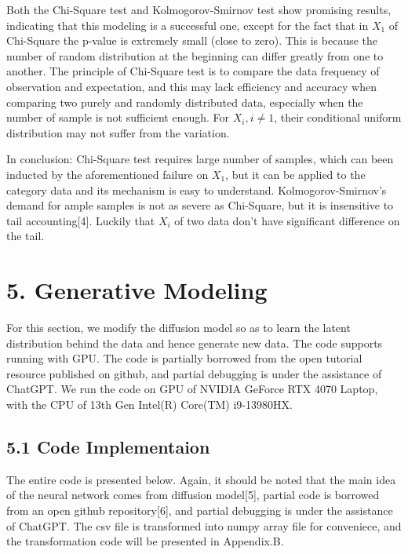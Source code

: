 \documentclass[11pt]{article}
\begin{document}
    Both the Chi-Square test and Kolmogorov-Smirnov test show promising
results, indicating that this modeling is a successful one, except for
the fact that in \(X_1\) of Chi-Square the p-value is extremely small
(close to zero). This is because the number of random distribution at
the beginning can differ greatly from one to another. The principle of
Chi-Square test is to compare the data frequency of observation and
expectation, and this may lack efficiency and accuracy when comparing
two purely and randomly distributed data, especially when the number of
sample is not sufficient enough. For \(X_i,i \neq 1\), their conditional
uniform distribution may not suffer from the variation.

In conclusion: Chi-Square test requires large number of samples, which
can been inducted by the aforementioned failure on \(X_1\), but it can
be applied to the category data and its mechanism is easy to understand.
Kolmogorov-Smirnov's demand for ample samples is not as severe as
Chi-Square, but it is insensitive to tail accounting{[}4{]}. Luckily
that \(X_i\) of two data don't have significant difference on the tail.

    \section*{5. Generative Modeling}\label{generative-modeling}

For this section, we modify the diffusion model so as to learn the
latent distribution behind the data and hence generate new data. The
code supports running with GPU. The code is partially borrowed from the
open tutorial resource published on github, and partial debugging is
under the assistance of ChatGPT. We run the code on GPU of NVIDIA
GeForce RTX 4070 Laptop, with the CPU of 13th Gen Intel(R) Core(TM)
i9-13980HX.

    \subsection*{5.1 Code Implementaion}\label{code-implementaion}

The entire code is presented below. Again, it should be noted that the
main idea of the neural network comes from diffusion model{[}5{]},
partial code is borrowed from an open github repository{[}6{]}, and
partial debugging is under the assistance of ChatGPT. The csv file is
transformed into numpy array file for conveniece, and the transformation
code will be presented in Appendix.B.
\end{document}

